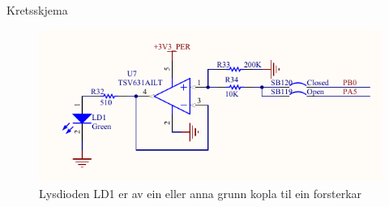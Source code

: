 \begin{frame}{Kretsskjema}
	
\begin{figure}
	\centering
	\includegraphics[width=0.7\linewidth]{img/schematic-user-led1-amplifier}
	\caption{Lysdioden LD1 er av ein eller anna grunn kopla til ein forsterkar}
	\label{fig:schematic-user-led1-amplifier}
\end{figure}

	
	
\end{frame}







